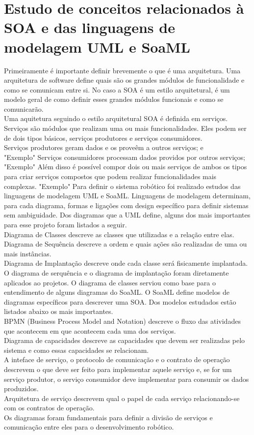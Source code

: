 \documentclass{article}
\begin{document}
\section{Estudo de conceitos relacionados à SOA e das linguagens de modelagem UML e SoaML}
Primeiramente é importante definir brevemente o que é uma arquitetura. Uma arquitetura de software define quais são os grandes módulos de funcionalidade e como se comunicam entre si. No caso a SOA é um estilo arquitetural, é um modelo geral de como definir esses grandes módulos funcionais e como se comunicarão.\\
Uma aquitetura seguindo o estilo arquitetural SOA é definida em serviços. Serviços são módulos que realizam uma ou mais funcionalidades. Eles podem ser de dois tipos básicos, serviços produtores e serviços consumidores.\\ 
	Serviços produtores geram dados e os proveêm a outros serviços; e\\ "Exemplo"
	Serviços consumidores processam dados providos por outros serviços;\\ "Exemplo"
Além disso é possível compor dois ou mais serviços de ambos os tipos para criar serviços compostos que podem realizar funcionalidades mais complexas. "Exemplo"
Para definir o sistema robótico foi realizado estudos das linguagens de modelagem UML e SoaML. Linguagens de modelagem determinam, para cada diagrama, formas e ligações com design específico para definir sistemas sem ambiguidade. Dos diagramas que a UML define, alguns dos mais importantes para esse projeto foram listados a seguir.\\
	Diagrama de Classes descreve as classes que utilizadas e a relação entre elas.\\
	Diagrama de Sequência descreve a ordem e quais ações são realizadas de uma ou mais instâncias.\\
	Diagrama de Implantação descreve onde cada classe será fisicamente implantada.\\
O diagrama de serquência e o diagrama de implantação foram diretamente aplicados ao projetos. O diagrama de classes serviou como base para o entendimento de alguns diagramas do SoaML. O SoaML define modelos de diagramas específicos para descrever uma SOA. Dos modelos estudados estão listados abaixo os mais importantes.\\
	BPMN (Business Process Model and Notation) descreve o fluxo das atividades que acontecem em que acontecem cada uma dos serviços.\\
	Diagrama de capacidades descreve as capacidades que devem ser realizadas pelo sistema e como essas capacidades se relacionam.\\
	A inteface de serviço, o protocolo de comunicação e o contrato de operação descrevem o que deve ser feito para implementar aquele serviço e, se for um serviço produtor, o serviço consumidor deve implementar para consumir os dados produzidos.\\
	Arquitetura de serviço descrevem qual o papel de cada serviço relacionando-se com os contratos de operação.\\
Os diagramas foram fundamentais para definir a divisão de serviços e comunicação entre eles para o desenvolvimento robótico.\\
\end{document}
